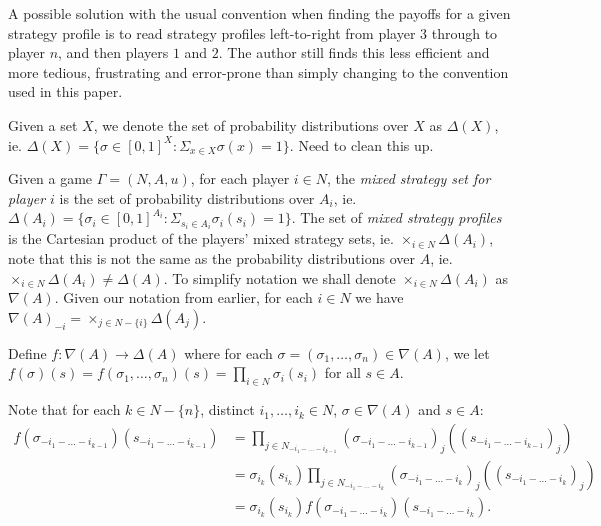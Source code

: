 	A possible solution with the usual convention when finding the payoffs for a given strategy profile is to read strategy profiles left-to-right from player $3$ through to player $n$, and then players $1$ and $2$. The author still finds this less efficient and more tedious, frustrating and error-prone than simply changing to the convention used in this paper.
	
	Given a set $X$, we denote the set of probability distributions over $X$ as $\Delta(X)$, ie. $\Delta(X) = \{\sigma \in [0,1]^X: \Sigma_{x \in X}\sigma(x) = 1\}$. Need to clean this up.
	
	Given a game $\Gamma = (N, A, u)$, for each player $i \in N$, the \textit{mixed strategy set for player $i$} is the set of probability distributions over $A_i$, ie. $\Delta(A_i) = \{\sigma_i \in [0,1]^{A_i}: \Sigma_{s_i \in A_i} \sigma_i(s_i) = 1\}$. The set of \textit{mixed strategy profiles} is the Cartesian product of the players' mixed strategy sets, ie. $\times_{i \in N}\Delta(A_i)$, note that this is not the same as the probability distributions over $A$, ie. $\times_{i \in N}\Delta(A_i) \neq \Delta(A)$. To simplify notation we shall denote $\times_{i \in N}\Delta(A_i)$ as $\nabla(A)$. Given our notation from earlier, for each $i \in N$ we have $\nabla(A)_{-i} = \times_{j \in N-\{i\}}\Delta(A_j)$. 
	
	Define $f:\nabla(A)\rightarrow\Delta(A)$ where for each $\sigma = (\sigma_1, \ldots, \sigma_n) \in \nabla(A)$, we let $f(\sigma)(s) = f(\sigma_1, \ldots, \sigma_n)(s) = \prod_{i \in N}\sigma_i(s_i)$ for all $s \in A$. 
	
	Note that for each $k \in N-\{n\}$, distinct $i_1, \ldots, i_k \in N$, $\sigma \in \nabla(A)$ and $s \in A$:
	\begin{align*}
		f(\sigma_{-i_1 - \ldots - i_{k-1}})(s_{-i_1 - \ldots - i_{k-1}}) &= \prod_{j \in N_{-i_1 - \ldots - i_{k-1}}}{(\sigma_{-i_1 - \ldots - i_{k-1}})}_j({(s_{-i_1 - \ldots - i_{k-1}})}_j) \\
		&= \sigma_{i_k}(s_{i_k})\prod_{j \in N_{-i_1 - \ldots - i_k}}{(\sigma_{-i_1 - \ldots - i_k})}_j({(s_{-i_1 - \ldots - i_k})}_j) \\
		&= \sigma_{i_k}(s_{i_k})f(\sigma_{-i_1 - \ldots - i_k})(s_{-i_1 - \ldots - i_k}). \\
	\end{align*}
	
